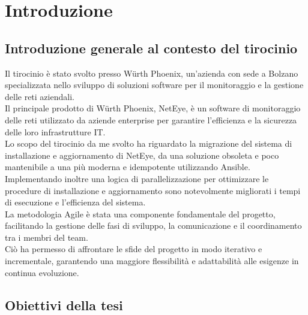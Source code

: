 \chapter{Introduzione}
\label{cha:introduzione}

\section{Introduzione generale al contesto del tirocinio}
\label{sec:tirocinio}

Il tirocinio è stato svolto presso Würth Phoenix, un'azienda con sede a Bolzano
specializzata nello sviluppo di soluzioni software per il monitoraggio e la
gestione delle reti aziendali.\\ Il principale prodotto di Würth Phoenix, NetEye,
è un software di monitoraggio delle reti utilizzato da aziende enterprise per
garantire l'efficienza e la sicurezza delle loro infrastrutture IT.\\ Lo scopo
del tirocinio da me svolto ha riguardato la migrazione del sistema di
installazione e aggiornamento di NetEye, da una soluzione obsoleta e poco mantenibile
a una più moderna e idempotente utilizzando Ansible.\\ Implementando inoltre una
logica di parallelizzazione per ottimizzare le procedure di installazione e aggiornamento
sono notevolmente migliorati i tempi di esecuzione e l'efficienza del sistema.\\
La metodologia Agile è stata una componente fondamentale del progetto,
facilitando la gestione delle fasi di sviluppo, la comunicazione e il coordinamento
tra i membri del team.\\ Ciò ha permesso di affrontare le sfide del progetto in modo
iterativo e incrementale, garantendo una maggiore flessibilità e adattabilità
alle esigenze in continua evoluzione.

\section{Obiettivi della tesi}
\label{sec:obiettivi}

